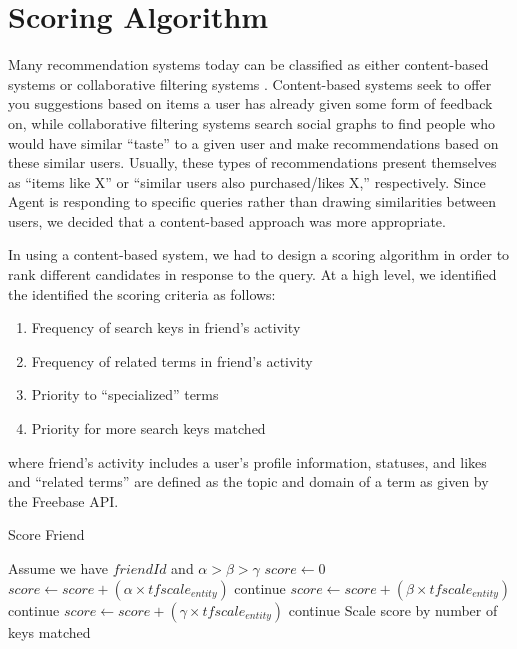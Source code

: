 

\section{Scoring Algorithm}
\label{sec:scoring}

Many recommendation systems today can be classified as either content-based
systems or collaborative filtering systems
\cite{recsys}. Content-based systems seek
to offer you suggestions based on items a user has already given some form of
feedback on, while collaborative filtering systems search social graphs to find
people who would have similar ``taste'' to a given user and make recommendations
based on these similar users. Usually, these types of recommendations present
themselves as ``items like X'' or ``similar users also purchased/likes X,''
respectively. Since Agent is responding to specific queries rather than drawing
similarities between users, we decided that a content-based approach was more
appropriate.

In using a content-based system, we had to design a scoring algorithm in order
to rank different candidates in response to the query. At a high level, we
identified the identified the scoring criteria as follows:
\begin{enumerate}
\item Frequency of search keys in friend's activity
\item Frequency of related terms in friend's activity
\item Priority to ``specialized'' terms
\item Priority for more search keys matched
\end{enumerate}
where friend's activity includes a user's profile information, statuses, and likes
and ``related terms'' are defined as the topic and domain of a term as given by the Freebase API.


\begin{algorithm}
\caption{Score Friend}
\begin{algorithmic}
\STATE Assume we have $friendId$ and $\alpha > \beta > \gamma$
\STATE $score \gets 0$
      \STATE $score \gets score + (\alpha \times tfscale_{entity})$
      \STATE continue
    \ENDIF
      \STATE $score \gets score + (\beta \times tfscale_{entity})$
      \STATE  continue
    \ENDIF
      \STATE $score \gets score + (\gamma \times tfscale_{entity})$
      \STATE  continue
    \ENDIF
\ENDFOR
\ENDFOR
\STATE Scale score by number of keys matched
\end{algorithmic}
\end{algorithm}

